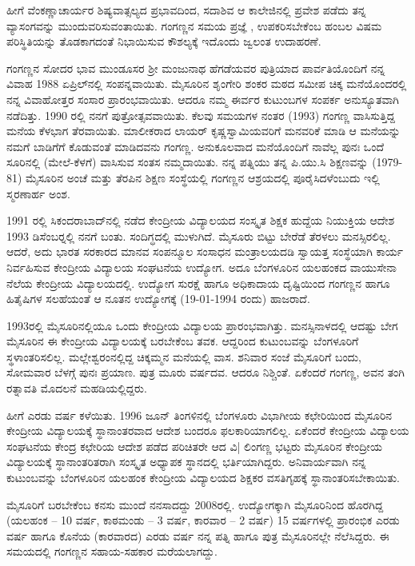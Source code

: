 ಹೀಗೆ ವೆಂಕಣ್ಣಾಚಾರ್ಯರ ಶಿಷ್ಯವಾತ್ಸಲ್ಯದ ಪ್ರಭಾವದಿಂದ, ಸದಾಶಿವ ಆ ಕಾಲೇಜಿನಲ್ಲಿ ಪ್ರವೇಶ ಪಡೆದು ತನ್ನ ವ್ಯಾಸಂಗವನ್ನು ಮುಂದುವರಿಸುವಂತಾಯಿತು. ಗಂಗಣ್ಣನ ಸಮಯ ಪ್ರಜ್ಞೆ , ಉಪಕರಿಸಬೇಕೆಂಬ ಹಂಬಲ ವಿಷಮ ಪರಿಸ್ಥಿತಿಯನ್ನು ತೊಡಕಾಗದಂತೆ ನಿಭಾಯಿಸುವ ಕೌಶಲ್ಯಕ್ಕೆ ಇದೊಂದು ಜ್ವಲಂತ ಉದಾಹರಣೆ. 

ಗಂಗಣ್ಣನ ಸೋದರ ಭಾವ ಮುಂಡೂಸರ ಶ್ರೀ ಮಂಜುನಾಥ ಹೆಗಡೆಯವರ ಪುತ್ರಿಯಾದ ಪಾರ್ವತಿಯೊಂದಿಗೆ ನನ್ನ ವಿವಾಹ 1988 ಏಪ್ರಿಲ್‍ನಲ್ಲಿ ಸಂಪನ್ನವಾಯಿತು. ಮೈಸೂರಿನ ಶೃಂಗೇರಿ ಶಂಕರ ಮಠದ ಸಮೀಪ ಚಿಕ್ಕ ಮನೆಯೊಂದರಲ್ಲಿ ನನ್ನ ವಿವಾಹೋತ್ತರ ಸಂಸಾರ ಪ್ರಾರಂಭವಾಯಿತು. ಆದರೂ ನಮ್ಮ ಈರ್ವರ ಕುಟುಂಬಗಳ ಸಂಪರ್ಕ ಅನುಸ್ಯೂತವಾಗಿ ನಡೆದಿತ್ತು. 1990 ರಲ್ಲಿ ನನಗೆ ಪುತ್ರೋತ್ಸವವಾಯಿತು. ಕೆಲವು ಸಮಯಗಳ ನಂತರ (1993) ಗಂಗಣ್ಣ ವಾಸಿಸುತ್ತಿದ್ದ ಮನೆಯ ಕೆಳಭಾಗ ತೆರವಾಯಿತು. ಮಾಲೀಕರಾದ ಲಾಯರ್ ಕೃಷ್ಣಸ್ವಾಮಿಯವರಿಗೆ ಮನವರಿಕೆ ಮಾಡಿ ಆ ಮನೆಯನ್ನು ನಮಗೆ ಬಾಡಿಗೆಗೆ ಕೊಡುವಂತೆ ಮಾಡಿದವನು ಗಂಗಣ್ಣ. ಅನುಕೂಲವಾದ ಮನೆಯೊಂದಿಗೆ ನಾವೆಲ್ಲ ಪುನಃ ಒಂದೆ ಸೂರಿನಲ್ಲಿ (ಮೇಲೆ-ಕೆಳಗೆ) ವಾಸಿಸುವ ಸಂತಸ ನಮ್ಮದಾಯಿತು. ನನ್ನ ಪತ್ನಿಯು ತನ್ನ ಪಿ.ಯು.ಸಿ ಶಿಕ್ಷಣವನ್ನು (1979-81) ಮೈಸೂರಿನ ಅಂಚೆ ಮತ್ತು ತೆರಪಿನ ಶಿಕ್ಷಣ ಸಂಸ್ಥೆಯಲ್ಲಿ ಗಂಗಣ್ಣನ ಆಶ್ರಯದಲ್ಲಿ ಪೂರೈಸಿದಳೆಂಬುದು ಇಲ್ಲಿ ಸ್ಮರಣಾರ್ಹ ಅಂಶ.

1991 ರಲ್ಲಿ ಸಿಕಂದರಾಬಾದ್‍ನಲ್ಲಿ ನಡೆದ ಕೇಂದ್ರೀಯ ವಿದ್ಯಾಲಯದ ಸಂಸ್ಕೃತ ಶಿಕ್ಷಕ ಹುದ್ದೆಯ ನಿಯುಕ್ತಿಯ ಆದೇಶ 1993 ಡಿಸೆಂಬರ್‍ನಲ್ಲಿ ನನಗೆ ಬಂತು. ಸಂದಿಗ್ಧದಲ್ಲಿ ಮುಳುಗಿದೆ. ಮೈಸೂರು ಬಿಟ್ಟು ಬೇರೆಡೆ ತೆರಳಲು ಮನಸ್ಸಿರಲಿಲ್ಲ. ಆದರೆ, ಅದು  ಭಾರತ ಸರಕಾರದ ಮಾನವ ಸಂಪನ್ಮೂಲ ಸಂಸಾಧನ ಮಂತ್ರಾಲಯದಡಿ ಸ್ವಾಯತ್ತ ಸಂಸ್ಥೆಯಾಗಿ ಕಾರ್ಯ ನಿರ್ವಹಿಸುವ ಕೇಂದ್ರೀಯ ವಿದ್ಯಾಲಯ ಸಂಘಟನೆಯ ಉದ್ಯೋಗ. ಅದೂ ಬೆಂಗಳೂರಿನ ಯಲಹಂಕದ ವಾಯುಸೇನಾ ನೆಲೆಯ ಕೇಂದ್ರೀಯ ವಿದ್ಯಾಲಯದಲ್ಲಿ. ಉದ್ಯೋಗ ಸುರಕ್ಷೆ ಹಾಗೂ ಅಧಿಕಾದಾಯ ದೃಷ್ಟಿಯಿಂದ ಗಂಗಣ್ಣನ ಹಾಗೂ ಹಿತೈಷಿಗಳ ಸಲಹೆಯಂತೆ ಆ ನೂತನ ಉದ್ಯೋಗಕ್ಕೆ (19-01-1994 ರಂದು) ಹಾಜರಾದೆ.

1993ರಲ್ಲಿ ಮೈಸೂರಿನಲ್ಲಿಯೂ ಒಂದು ಕೇಂದ್ರೀಯ ವಿದ್ಯಾಲಯ ಪ್ರಾರಂಭವಾಗಿತ್ತು. ಮನಸ್ಸಿನಾಳದಲ್ಲಿ ಆದಷ್ಟು ಬೇಗ ಮೈಸೂರಿನ ಈ ಕೇಂದ್ರೀಯ ವಿದ್ಯಾಲಯಕ್ಕೆ ಬರಬೇಕೆಂಬ ತವಕ. ಆದ್ದರಿಂದ ಕುಟುಂಬವನ್ನು ಬೆಂಗಳೂರಿಗೆ ಸ್ಥಳಾಂತರಿಸಲಿಲ್ಲ. ಮಲ್ಲೇಶ್ವರಂನಲ್ಲಿದ್ದ ಚಿಕ್ಕಮ್ಮನ ಮನೆಯಲ್ಲಿ ವಾಸ. ಶನಿವಾರ ಸಂಜೆ ಮೈಸೂರಿಗೆ ಬಂದು, ಸೋಮವಾರ ಬೆಳಗ್ಗೆ ಪುನಃ ಪ್ರಯಾಣ. ಪುತ್ರ ಮೂರು ವರ್ಷದವ. ಆದರೂ ನಿಶ್ಚಿಂತೆ. ಏಕೆಂದರೆ ಗಂಗಣ್ಣ, ಅವನ ತಂಗಿ ರತ್ನಾವತಿ ಮೊದಲನೆ ಮಹಡಿಯಲ್ಲಿದ್ದರು.

ಹೀಗೆ ಎರಡು ವರ್ಷ ಕಳೆಯಿತು. 1996 ಜೂನ್ ತಿಂಗಳಿನಲ್ಲಿ ಬೆಂಗಳೂರು ವಿಭಾಗೀಯ ಕಛೇರಿಯಿಂದ ಮೈಸೂರಿನ ಕೇಂದ್ರೀಯ ವಿದ್ಯಾಲಯಕ್ಕೆ ಸ್ಥಾನಾಂತರವಾದ ಆದೇಶ ಬಂದರೂ ಫಲಕಾರಿಯಾಗಲಿಲ್ಲ. ಏಕೆಂದರೆ ಕೇಂದ್ರೀಯ ವಿದ್ಯಾಲಯ ಸಂಘಟನೆಯ ಕೇಂದ್ರ ಕಛೇರಿಯ ಆದೇಶ ಪಡೆದ ಪರಿಚಿತರೇ ಆದ ವಿ| ಲಿಂಗಣ್ಣ ಭಟ್ಟರು ಮೈಸೂರಿನ ಕೇಂದ್ರೀಯ ವಿದ್ಯಾಲಯಕ್ಕೆ ಸ್ಥಾನಾಂತರಿತರಾಗಿ ಸಂಸ್ಕೃತ ಅಧ್ಯಾಪಕ ಸ್ಥಾನದಲ್ಲಿ ಭರ್ತಿಯಾಗಿದ್ದರು. ಅನಿವಾರ್ಯವಾಗಿ ನನ್ನ ಕುಟುಂಬವನ್ನು ಬೆಂಗಳೂರಿನ ಯಲಹಂಕ ಕೇಂದ್ರೀಯ ವಿದ್ಯಾಲಯದ ಶಿಕ್ಷಕರ ವಸತಿಗೃಹಕ್ಕೆ ಸ್ಥಾನಾಂತರಿಸಬೇಕಾಯಿತು.

ಮೈಸೂರಿಗೆ ಬರಬೇಕೆಂಬ ಕನಸು ಮುಂದೆ ನನಸಾದದ್ದು 2008ರಲ್ಲಿ. ಉದ್ಯೋಗಕ್ಕಾಗಿ ಮೈಸೂರಿನಿಂದ ಹೊರಗಿದ್ದ (ಯಲಹಂಕ – 10 ವರ್ಷ, ಕಾಠಮಂಡು – 3 ವರ್ಷ, ಕಾರವಾರ – 2 ವರ್ಷ) 15 ವರ್ಷಗಳಲ್ಲಿ ಪ್ರಾರಂಭಿಕ ಎರಡು ವರ್ಷ ಹಾಗೂ ಕೊನೆಯ (ಕಾರವಾರದ) ಎರಡು ವರ್ಷ ನನ್ನ ಪತ್ನಿ ಹಾಗೂ ಪುತ್ರ ಮೈಸೂರಿನಲ್ಲೇ ನೆಲೆಸಿದ್ದರು. ಈ ಸಮಯದಲ್ಲಿ ಗಂಗಣ್ಣನ ಸಹಾಯ-ಸಹಕಾರ ಮರೆಯಲಾಗದ್ದು.

